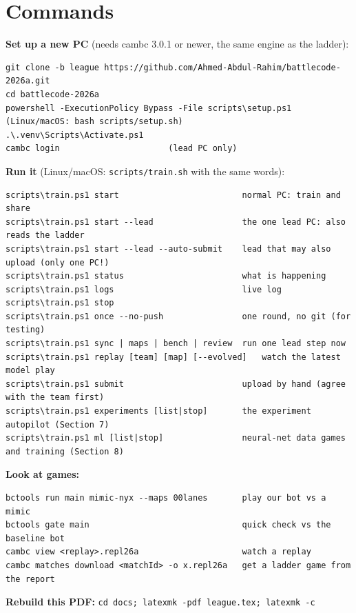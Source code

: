 \documentclass[11pt,a4paper]{article}
\newcommand{\f}[1]{\texttt{#1}}
\begin{document}
\section{Commands}
\textbf{Set up a new PC} (needs cambc 3.0.1 or newer, the same engine as the ladder):
\begin{lstlisting}
git clone -b league https://github.com/Ahmed-Abdul-Rahim/battlecode-2026a.git
cd battlecode-2026a
powershell -ExecutionPolicy Bypass -File scripts\setup.ps1     (Linux/macOS: bash scripts/setup.sh)
.\.venv\Scripts\Activate.ps1
cambc login                      (lead PC only)
\end{lstlisting}
\textbf{Run it} (Linux/macOS: \f{scripts/train.sh} with the same words):
\begin{lstlisting}
scripts\train.ps1 start                         normal PC: train and share
scripts\train.ps1 start --lead                  the one lead PC: also reads the ladder
scripts\train.ps1 start --lead --auto-submit    lead that may also upload (only one PC!)
scripts\train.ps1 status                        what is happening
scripts\train.ps1 logs                          live log
scripts\train.ps1 stop
scripts\train.ps1 once --no-push                one round, no git (for testing)
scripts\train.ps1 sync | maps | bench | review  run one lead step now
scripts\train.ps1 replay [team] [map] [--evolved]   watch the latest model play
scripts\train.ps1 submit                        upload by hand (agree with the team first)
scripts\train.ps1 experiments [list|stop]       the experiment autopilot (Section 7)
scripts\train.ps1 ml [list|stop]                neural-net data games and training (Section 8)
\end{lstlisting}
\textbf{Look at games:}
\begin{lstlisting}
bctools run main mimic-nyx --maps 00lanes       play our bot vs a mimic
bctools gate main                               quick check vs the baseline bot
cambc view <replay>.repl26a                     watch a replay
cambc matches download <matchId> -o x.repl26a   get a ladder game from the report
\end{lstlisting}
\textbf{Rebuild this PDF:} \f{cd docs; latexmk -pdf league.tex; latexmk -c}
\end{document}

